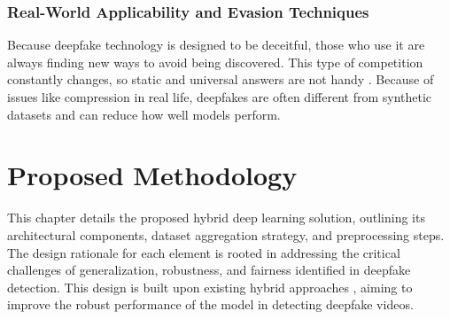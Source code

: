 \documentclass[conference]{IEEEtran}
\begin{document}
\subsubsection{Real-World Applicability and Evasion Techniques}
Because deepfake technology is designed to be deceitful, those who use it are always finding new ways to avoid being discovered. This type of competition constantly changes, so static and universal answers are not handy \cite{mubarak2023survey}. Because of issues like compression in real life, deepfakes are often different from synthetic datasets and can reduce how well models perform.



\section{Proposed Methodology}
This chapter details the proposed hybrid deep learning solution, outlining its architectural components, dataset aggregation strategy, and preprocessing steps. The design rationale for each element is rooted in addressing the critical challenges of generalization, robustness, and fairness identified in deepfake detection. This design is built upon existing hybrid approaches \cite{antad2024hybrid} \cite{rana2021ml}, aiming to improve the robust performance of the model in detecting deepfake videos.
\end{document}
